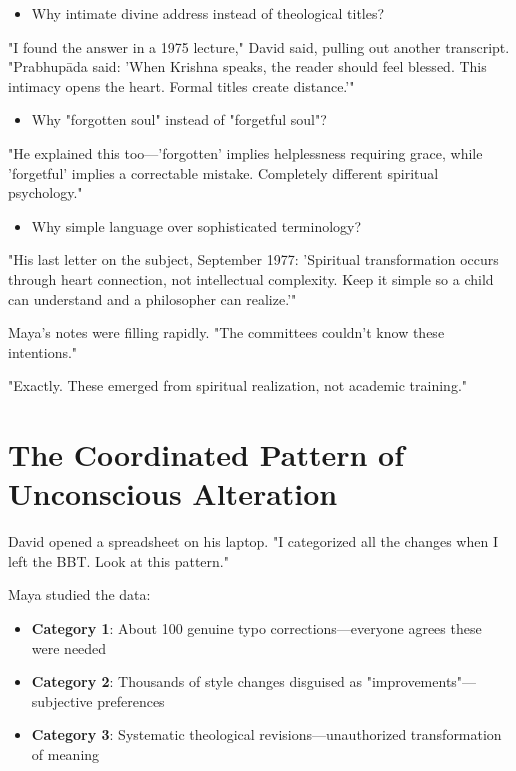 \documentclass[11pt,twoside]{book}
\begin{document}
\begin{itemize}
\begin{itemize}
\item Why intimate divine address instead of theological titles?
\end{itemize}

"I found the answer in a 1975 lecture," David said, pulling out another transcript. "Prabhupāda said: 'When Krishna speaks, the reader should feel blessed. This intimacy opens the heart. Formal titles create distance.'"

\begin{itemize}
\item Why "forgotten soul" instead of "forgetful soul"?
\end{itemize}

"He explained this too—'forgotten' implies helplessness requiring grace, while 'forgetful' implies a correctable mistake. Completely different spiritual psychology."

\begin{itemize}
\item Why simple language over sophisticated terminology?
\end{itemize}

"His last letter on the subject, September 1977: 'Spiritual transformation occurs through heart connection, not intellectual complexity. Keep it simple so a child can understand and a philosopher can realize.'"

Maya's notes were filling rapidly. "The committees couldn't know these intentions."

"Exactly. These emerged from spiritual realization, not academic training."
\end{itemize}
\section*{The Coordinated Pattern of Unconscious Alteration}
\label{sec:org9c7ce49}

David opened a spreadsheet on his laptop. "I categorized all the changes when I left the BBT. Look at this pattern."

Maya studied the data:
\begin{itemize}
\item \textbf{\textbf{Category 1}}: About 100 genuine typo corrections—everyone agrees these were needed
\item \textbf{\textbf{Category 2}}: Thousands of style changes disguised as "improvements"—subjective preferences
\item \textbf{\textbf{Category 3}}: Systematic theological revisions—unauthorized transformation of meaning
\end{itemize}
\end{document}
